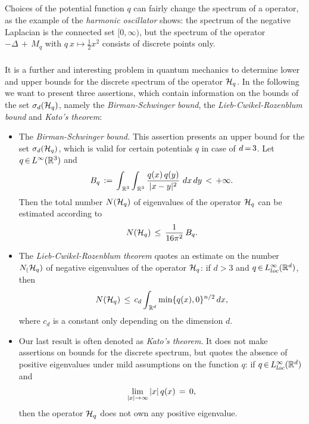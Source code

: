 \documentclass[11pt,twoside]{article}
\begin{document}
\begin{itemize}[leftmargin=17pt]
\subparagraph{} %
Choices of the potential function $q$
can fairly change the spectrum of a {\SCHROEDINGER} operator,
as the example of the \textit{harmonic oscillator} shows:
the spectrum of the negative Laplacian is the connected set $[0,\infty)$,
but the spectrum of the operator $-\Delta {\,+\,} M_q$ 
with $q \: x \mapsto \frac{1}{2}x^2$ consists of discrete points only.

\subparagraph{} %
It is a further and interesting problem in quantum mechanics
to determine lower and upper bounds for the discrete spectrum
of the operator ${\mathcal{H}}_q$.
In the following we want to present three assertions,
which contain information on the bounds of the set $\sigma_d({\mathcal{H}}_q)$,
namely
the \textit{Birman-Schwinger} \textit{bound}, 
the \textit{Lieb-Cwikel-Rozenblum} \textit{bound} and
    \textit{Kato}\textit{'s theorem}:

\begin{itemize}[leftmargin=4mm]
\item[1.]
The \textit{Birman-Schwinger} \textit{bound.}
This assertion presents an upper bound for the set $\sigma_d({\mathcal{H}}_q)$,
which is valid for certain potentials $q$ in case of $d {\,=\,} 3$.
Let $q {\,\in\,} L^{\infty}({\mathbb{R}}^3)$ and 
\[
B_q \eqdef
\int_{\,\R^3} \int_{\,\R^3} \frac{q(x) \, q(y)}{\abs{x-y} ^2} \ dx \, dy
\, < \, + \infty.
\]
Then the total number $N({\mathcal{H}}_q)$ of eigen\-values of the operator ${\mathcal{H}}_q$
can be estimated according to
\[
N({\mathcal{H}}_q) \, \leq \, \frac{1}{16 \pi^2} \, B_q.
\]

\item[2.]
The \textit{Lieb-Cwikel-Rozenblum} \textit{theorem}
quotes an estimate on the number $N_({\mathcal{H}}_q)$
of negative eigen\-values of the operator ${\mathcal{H}}_q$:
if $d > 3$ and $q {\,\in\,} L_{loc}^{\infty}({\mathbb{R}}^d)$,
then
\[
N({\mathcal{H}}_q) \, \leq \, c_d \int_{\,{\mathbb{R}}^d} \min \{q(x),0\}^{n/2} \, dx,
\]
where $c_d$ is a constant only depending on the dimension $d$.

\item[3.]
Our last result is often denoted as \textit{Kato}\textit{'s theorem}.
It does not make assertions on bounds for the discrete spectrum,
but quotes the absence of positive eigen\-values
under mild assumptions on the function $q$:
if $q {\,\in\,} L_{loc}^{\infty}({\mathbb{R}}^d)$ and
\[
\lim_{\abs{x} \to \infty} \, \abs{x} \, q(x) \= 0,
\]
then the operator ${\mathcal{H}}_q$ does not own any positive eigen\-value.
\end{itemize}
\end{itemize}
\end{document}
